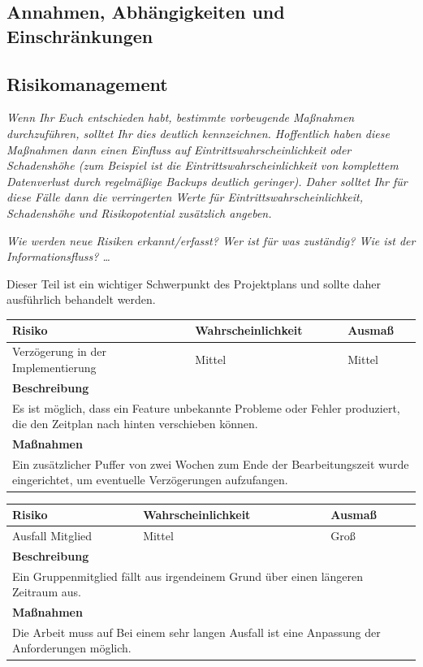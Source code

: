 \documentclass[fontsize=12pt,paper=a4,twoside]{scrartcl}
\begin{document}
\subsection{Annahmen, Abhängigkeiten und Einschränkungen}

\subsection{Risikomanagement}\label{riskmanagement}

{\em Wenn Ihr Euch entschieden habt, bestimmte vorbeugende Maßnahmen 
     durchzuführen, solltet Ihr dies deutlich kennzeichnen. Hoffentlich
     haben diese Maßnahmen dann einen Einfluss auf Eintrittswahrscheinlichkeit oder Schadenshöhe (zum Beispiel
     ist die Eintrittswahrscheinlichkeit von komplettem Datenverlust durch regelmäßige Backups deutlich 
     geringer). Daher solltet Ihr für diese Fälle dann die verringerten Werte für Eintrittswahrscheinlichkeit, 
     Schadenshöhe und Risikopotential zusätzlich angeben. }

{\em Wie werden neue Risiken erkannt/erfasst? Wer ist für was
  zuständig? Wie ist der Informationsfluss? \ldots 

Dieser Teil ist ein
  wichtiger Schwerpunkt des Projektplans und sollte daher ausführlich
  behandelt werden.}
  
	\begin{tabular}{|p{4cm}|p{4cm}|p{4cm}|}
	\hline
	\textbf{Risiko} & Wahrscheinlichkeit & Ausmaß \\
	\hline
	Verzögerung in der Implementierung & Mittel & Mittel \\
	\hline
	\multicolumn{3}{|p{12cm}|}{\textbf{Beschreibung}} \\
	\hline
	\multicolumn{3}{|p{12cm}|}{Es ist möglich, dass ein Feature unbekannte Probleme oder Fehler produziert, die den Zeitplan nach hinten verschieben können.} \\
	\hline
	\multicolumn{3}{|p{12cm}|}{\textbf{Maßnahmen}} \\
	\hline
	\multicolumn{3}{|p{12cm}|}{Ein zusätzlicher Puffer von zwei Wochen zum Ende der Bearbeitungszeit wurde eingerichtet, um eventuelle Verzögerungen aufzufangen.} \\
	\hline
	\end{tabular}
  
    \begin{tabular}{|p{4cm}|p{4cm}|p{4cm}|}
    \hline
    \textbf{Risiko} & Wahrscheinlichkeit & Ausmaß \\
    \hline
    Ausfall Mitglied & Mittel & Groß \\
    \hline
    \multicolumn{3}{|p{12cm}|}{\textbf{Beschreibung}} \\
    \hline
    \multicolumn{3}{|p{12cm}|}{Ein Gruppenmitglied fällt aus irgendeinem Grund über einen längeren Zeitraum aus.} \\
    \hline
    \multicolumn{3}{|p{12cm}|}{\textbf{Maßnahmen}} \\
    \hline
    \multicolumn{3}{|p{12cm}|}{Die Arbeit muss auf Bei einem sehr langen Ausfall ist eine Anpassung der Anforderungen möglich.} \\
    \hline
    \end{tabular}
\end{document}
